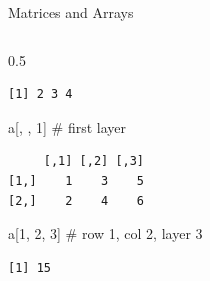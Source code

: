 \documentclass[
  ignorenonframetext,
  aspectratio=169,
]{beamer}
\newenvironment{Shaded}{\begin{snugshade}}{\end{snugshade}}
\newcommand{\CommentTok}[1]{\textcolor[rgb]{0.37,0.37,0.37}{#1}}
\newcommand{\DecValTok}[1]{\textcolor[rgb]{0.68,0.00,0.00}{#1}}
\newcommand{\NormalTok}[1]{\textcolor[rgb]{0.00,0.23,0.31}{#1}}
\begin{document}
\begin{frame}[fragile]{Matrices and Arrays}
\begin{columns}[T]
\begin{column}{0.5\textwidth}
\begin{verbatim}
[1] 2 3 4
\end{verbatim}

\begin{Shaded}
\begin{Highlighting}[]
\NormalTok{a[, , }\DecValTok{1}\NormalTok{]     }\CommentTok{\# first layer}
\end{Highlighting}
\end{Shaded}

\begin{verbatim}
     [,1] [,2] [,3]
[1,]    1    3    5
[2,]    2    4    6
\end{verbatim}

\begin{Shaded}
\begin{Highlighting}[]
\NormalTok{a[}\DecValTok{1}\NormalTok{, }\DecValTok{2}\NormalTok{, }\DecValTok{3}\NormalTok{]   }\CommentTok{\# row 1, col 2, layer 3}
\end{Highlighting}
\end{Shaded}

\begin{verbatim}
[1] 15
\end{verbatim}
\end{column}
\end{columns}
\end{frame}
\end{document}
